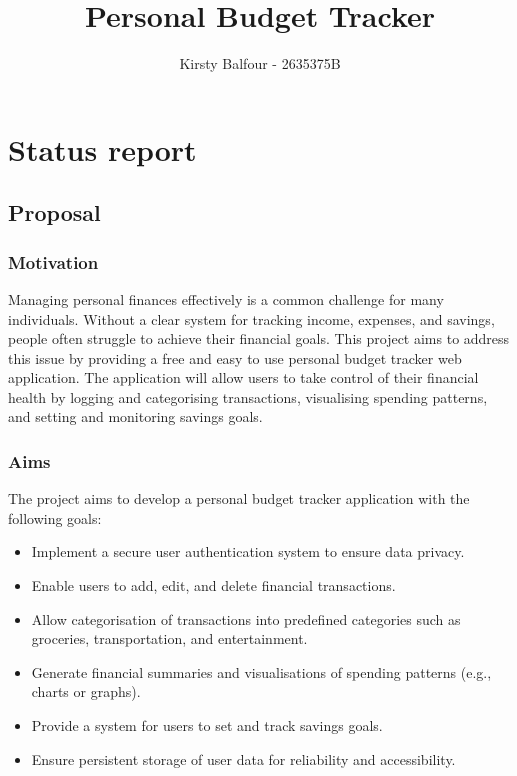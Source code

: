 \documentclass[11pt]{article}
\title{ Personal Budget Tracker }
\author{ Kirsty Balfour - 2635375B }
\begin{document}
    \maketitle  
     
\section{Status report}

\subsection{Proposal}\label{proposal}

\subsubsection{Motivation}\label{motivation}
Managing personal finances effectively is a common challenge for many individuals. Without a clear system for tracking income, expenses, and savings, people often struggle to achieve their financial goals. This project aims to address this issue by providing a free and easy to use personal budget tracker web application. The application will allow users to take control of their financial health by logging and categorising transactions, visualising spending patterns, and setting and monitoring savings goals.

\subsubsection{Aims}\label{aims}
The project aims to develop a personal budget tracker application with the following goals:
\begin{itemize}
    \item Implement a secure user authentication system to ensure data privacy.
    \item Enable users to add, edit, and delete financial transactions.
    \item Allow categorisation of transactions into predefined categories such as groceries, transportation, and entertainment.
    \item Generate financial summaries and visualisations of spending patterns (e.g., charts or graphs).
    \item Provide a system for users to set and track savings goals.
    \item Ensure persistent storage of user data for reliability and accessibility.
  \end{itemize}
\end{document}
